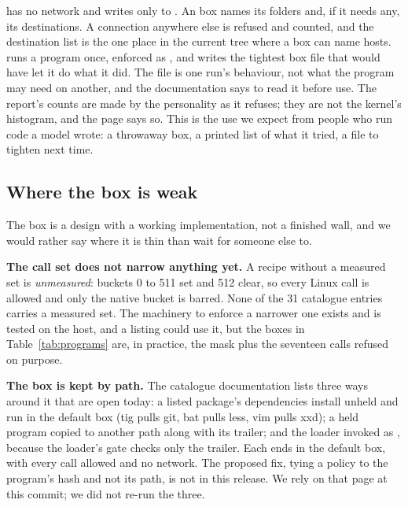  has no network and writes only to . An  box names its folders and, if it needs any, its destinations. A connection anywhere else is refused and counted, and the destination list is the one place in the current tree where a box can name hosts.  runs a program once, enforced as , and writes the tightest box file that would have let it do what it did. The file is one run's behaviour, not what the program may need on another, and the documentation says to read it before use. The report's counts are made by the personality as it refuses; they are not the kernel's histogram, and the page says so. This is the use we expect from people who run code a model wrote: a throwaway box, a printed list of what it tried, a file to tighten next time.

\subsection{Where the box is weak}\label{sec:box-limits}

The box is a design with a working implementation, not a finished wall, and we would rather say where it is thin than wait for someone else to.

\textbf{The call set does not narrow anything yet.} A recipe without a measured set is \emph{unmeasured}: buckets 0 to 511 set and 512 clear, so every Linux call is allowed and only the native bucket is barred. None of the 31 catalogue entries carries a measured set. The machinery to enforce a narrower one exists and is tested on the host, and a listing could use it, but the boxes in Table~\ref{tab:programs} are, in practice, the mask plus the seventeen calls refused on purpose.

\textbf{The box is kept by path.} The catalogue documentation lists three ways around it that are open today: a listed package's dependencies install unheld and run in the default box (tig pulls git, bat pulls less, vim pulls xxd); a held program copied to another path along with its trailer; and the loader invoked as , because the loader's gate checks only the trailer. Each ends in the default box, with every call allowed and no network. The proposed fix, tying a policy to the program's hash and not its path, is not in this release. We rely on that page at this commit; we did not re-run the three.

